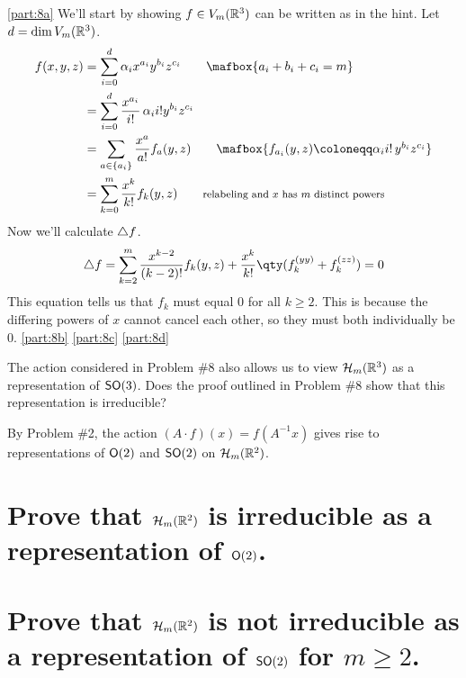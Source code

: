 \documentclass[
	pages,
	boxes,
	color=WildStrawberry
]{homework}
\begin{document}
\begin{solution}
	\ref{part:8a}
	We'll start by showing $f\in V_m(\mathbb{R}^3)$ can be written as in the hint. Let $d = \dim V_m(\mathbb{R}^3)$.
	\begin{align*}
		f(x, y, z) & = \sum_{i = 0}^{d}\alpha_i x^{a_i}y^{b_i}z^{c_i} \tag*{$\mafbox{a_i + b_i + c_i = m}$}                               \\
		           & = \sum_{i = 0}^{d}\frac{x^{a_i}}{i!}\,\alpha_i i! y^{b_i}z^{c_i}                                                     \\
		           & = \sum_{a\in \{a_i\}} \frac{x^{a}}{a!}f_a (y, z) \tag*{$\mafbox{f_{a_i} (y, z)\defeq\alpha_i i! \, y^{b_i}z^{c_i}}$} \\
		           & = \sum_{k = 0}^{m}\frac{x^k}{k!}f_k(y, z) \tag*{\footnotesize{relabeling and $x$ has $m$ distinct powers}}
	\end{align*}
	Now we'll calculate $\triangle{f}$.
	\begin{equation*}
		\laplace{f} = \sum_{k = 2}^{m}\frac{x^{k - 2}}{(k - 2)!}f_k(y, z) + \frac{x^k}{k!}\qty(f_k^{(yy)} + f_k^{(zz)}) = 0
	\end{equation*}
	This equation tells us that $f_k$ must equal 0 for all $k\geq 2$. This is because the differing powers of $x$ cannot cancel each other, so they must both individually be 0.
	\ref{part:8b}
	\ref{part:8c}
	\ref{part:8d}
\end{solution}

\begin{problem}
The action considered in Problem \#8 also allows us to view $\mathcal{H}_m(\mathbb{R}^3)$ as a representation of $\mathsf{SO}(3)$. Does the proof outlined in Problem \#8 show that this representation is irreducible?
\end{problem}

\begin{problem}
By Problem \#2, the action $(A\cdot f)(x) = f(A^{-1}x)$ gives rise to representations of $\mathsf{O}(2)$ and $\mathsf{SO}(2)$ on $\mathcal{H}_m(\mathbb{R}^2)$.
\begin{parts}
	\part{Prove that $\mathcal{H}_m(\mathbb{R}^2)$ is irreducible as a representation of $\mathsf{O}(2)$.}\label{part:10a}
	\part{Prove that $\mathcal{H}_m(\mathbb{R}^2)$ is not irreducible as a representation of $\mathsf{SO}(2)$ for $m \geq 2$.}\label{part:10a}
\end{parts}
\end{problem}

\begin{solution}
\end{solution}
\end{document}
